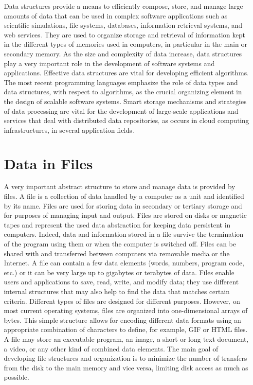 Data structures provide a means to efficiently compose, store, and manage large amounts of data that can be used in complex software applications such as scientific simulations, file systems, databases, information retrieval systems, and web services. They are used to organize storage and retrieval of information kept in the different types of memories used in computers, in particular in the main or secondary memory. As the size and complexity of data increase, data structures play a very important role in the development of software systems and applications. Effective data structures are vital for developing efficient algorithms. The most recent programming languages emphasize the role of data types and data structures, with respect to algorithms, as the crucial organizing element in the design of scalable software systems. Smart storage mechanisms and strategies of data processing are vital for the development of large-scale applications and services that deal with distributed data repositories, as occurs in cloud computing infrastructures, in several application fields.

\section{\label{sec:3.2}Data in Files}

A very important abstract structure to store and manage data is provided by files. A file is a collection of data handled by a computer as a unit and identified by its name. Files are used for storing data in secondary or tertiary storage and for purposes of managing input and output. Files are stored on disks or magnetic tapes and represent the used data abstraction for keeping data persistent in computers. Indeed, data and information stored in a file survive the termination of the program using them or when the computer is switched off. Files can be shared with and transferred between computers via removable media or the Internet. A file can contain a few data elements (words, numbers, program code, etc.) or it can be very large up to gigabytes or terabytes of data. Files enable users and applications to save, read, write, and modify data; they use different internal structures that may also help to find the data that matches certain criteria. Different types of files are designed for different purposes. However, on most current operating systems, files are organized into one-dimensional arrays of bytes. This simple structure allows for encoding different data formats using an appropriate combination of characters to define, for example, GIF or HTML files. A file may store an executable program, an image, a short or long text document, a video, or any other kind of combined data elements. The main goal of developing file structures and organization is to minimize the number of transfers from the disk to the main memory and vice versa, limiting disk access as much as possible.

